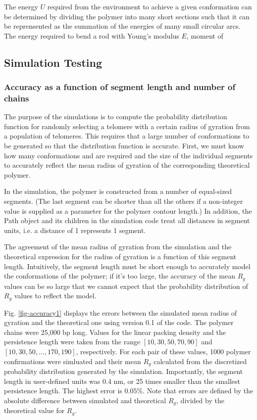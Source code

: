 \documentclass[11pt]{article}
\begin{document}
The energy $U$ required from the environment to achieve a given
conformation can be determined by dividing the polymer into many short
sections such that it can be reprensented as the summation of the
energies of many small circular arcs. The energy required to bend a
rod with Young's modulus $E$, moment of 

\subsection{Simulation Testing}
\label{sec-3-3}

\subsubsection{Accuracy as a function of segment length and number of chains}
\label{sec-3-3-1}
The purpose of the simulations is to compute the probability
distribution function for randomly selecting a telomere with a certain
radius of gyration from a population of telomeres. This requires that
a large number of conformations to be generated so that the
distribution function is accurate. First, we must know how many
conformations and are required and the size of the individual segments
to accurately reflect the mean radius of gyration of the corresponding
theoretical polymer.

In the simulation, the polymer is constructed from a number of
equal-sized segments. (The last segment can be shorter than all the
others if a non-integer value is supplied as a parameter for the
polymer contour length.) In addition, the Path object and its children
in the simulation code treat all distances in segment units, i.e. a
distance of 1 represents 1 segment.

The agreement of the mean radius of gyration from the simulation and
the theoretical expression for the radius of gyration is a function of
this segment length. Intuitively, the segment length must be short
enough to accurately model the conformations of the polymer; if it's
too large, the accuracy of the mean $R_g$ values can be so large that
we cannot expect that the probability distribution of $R_g$ values to
reflect the model.

Fig. \ref{fig-accuracy1} displays the errors between the simulated
mean radius of gyration and the theoretical one using version 0.1 of
the code. The polymer chains were 25,000 bp long. Values for the
linear packing density and the persistence length were taken from the
range $\left[ 10, 30, 50, 70, 90 \right]$ and $\left[ 10, 30, 50,
\ldots, 170, 190\right]$, respectively. For each pair of these values,
1000 polymer confirmations were simluated and their mean $R_g$
calculated from the discretized probability distribution generated by
the simulation. Importantly, the segment length in user-defined units
was 0.4 nm, or 25 times smaller than the smallest persistence
length. The highest error is $0.05\%$. Note that errors are defined by
the absolute difference between simulated and theoretical $R_g$,
divided by the theoretical value for $R_g$.
\end{document}
